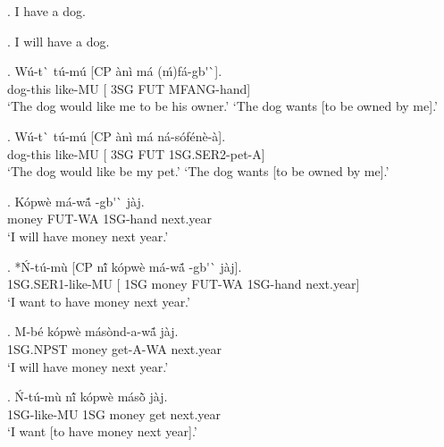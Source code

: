 \documentclass{assets/fieldnotes}
\begin{document}


\ex. I have a dog. 

\ex. I will have a dog.

\exg. W\'{u}-t\`{} t\'{u}-m\'{u} [CP \`{a}n\`{i} m\'{a} (\'{m})f\'{a}-gb\'{}\`{}]. \\
dog-this like-MU [ 3SG FUT MFANG-hand] \\
`The dog would like me to be his owner.' \newline
`The dog wants [to be owned by me].' 


\exg. W\'{u}-t\`{} t\'{u}-m\'{u} [CP \`{a}n\`{i} m\'{a} n\'{a}-s\'{o}f\'{e}n\`{e}-\`{a}]. \\
dog-this like-MU [ 3SG FUT 1SG.SER2-pet-A] \\
`The dog would like be my pet.' \newline
`The dog wants [to be owned by me].'


\exg. K\'{o}pw\`{e} m\'{a}-wã́ -gb\'{}\`{} j\`{a}j.  \\
money FUT-WA 1SG-hand next.year \\
`I will have money next year.'

\exg. *\'{N}-t\'{u}-m\`{u} [CP nĩ́  k\'{o}pw\`{e} m\'{a}-wã́ -gb\'{}\`{} j\`{a}j].  \\
1SG.SER1-like-MU [ 1SG money FUT-WA 1SG-hand next.year] \\
`I want to have money next year.' 

\exg. M-b\'{e} k\'{o}pw\`{e} m\'{a}s\`{o}nd-a-wã́ j\`{a}j.  \\
1SG.NPST money get-A-WA next.year \\
`I will have money next year.'

\exg. \'{N}-t\'{u}-m\`{u} nĩ́ k\'{o}pw\`{e} m\'{a}sõ̀ j\`{a}j.  \\
1SG-like-MU 1SG money get next.year \\
`I want [to have money next year].' 
\end{document}
